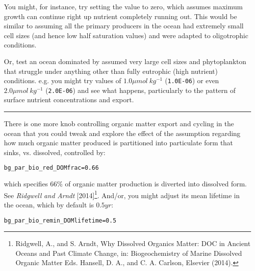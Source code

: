 \vspace{1mm}
You might, for instance, try setting the value to zero, which assumes maximum growth can continue right up nutrient completely running out. This would be similar to assuming all the primary producers in the ocean had extremely small cell sizes (and hence low half saturation values) and were adapted to oligotrophic conditions.

Or, test an ocean dominated by assumed very large cell sizes and phytoplankton that struggle under anything other than fully eutrophic (high nutrient) conditions. e.g. you might try values of \(1.0 \mu mol \:kg^{-1}\) (\texttt{1.0E-06}) or even \(2.0 \mu mol \:kg^{-1}\) (\texttt{2.0E-06}) and see what happens, particularly to the pattern of surface nutrient concentrations and export.

\vspace{1mm} \noindent\rule{4cm}{0.5pt} \vspace{2mm}

\newpage

\noindent There is one more knob controlling organic matter export and cycling in the ocean that you could tweak and explore the effect of the assumption regarding how much organic matter produced is partitioned into particulate form that sinks, vs. dissolved, controlled by:
\vspace{-2mm}\small\begin{verbatim}
bg_par_bio_red_DOMfrac=0.66
\end{verbatim}\normalsize\vspace{-2mm}
which specifies 66\% of organic matter production is diverted into dissolved form. See \textit{Ridgwell and Arndt} [2014]\footnote{Ridgwell, A., and S. Arndt, Why Dissolved Organics Matter: DOC in Ancient Oceans and Past Climate Change, in: Biogeochemistry of Marine Dissolved Organic Matter Eds. Hansell, D. A., and C. A. Carlson, Elsevier (2014).}. And/or, you might adjust its mean lifetime in the ocean, which by default is  \(0.5 yr\):
\vspace{-2mm}\small\begin{verbatim}
bg_par_bio_remin_DOMlifetime=0.5
\end{verbatim}\normalsize\vspace{0mm}


